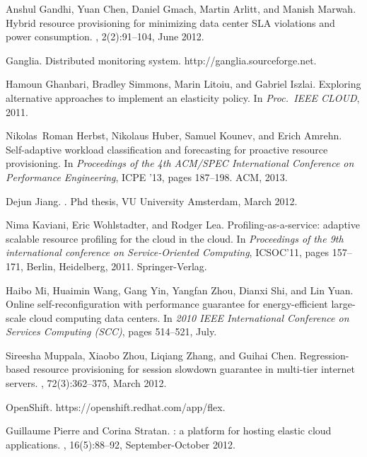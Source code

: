 \documentclass{sig-alternate-10pt}
\begin{document}
\begin{thebibliography}{10}
Anshul Gandhi, Yuan Chen, Daniel Gmach, Martin Arlitt, and Manish Marwah.
\newblock Hybrid resource provisioning for minimizing data center {SLA}
  violations and power consumption.
, 2(2):91--104,
  June 2012.

{Ganglia. Distributed monitoring system. http://ganglia.sourceforge.net}.

Hamoun Ghanbari, Bradley Simmons, Marin Litoiu, and Gabriel Iszlai.
\newblock Exploring alternative approaches to implement an elasticity policy.
\newblock In {\em Proc.\ IEEE CLOUD}, 2011.

Nikolas~Roman Herbst, Nikolaus Huber, Samuel Kounev, and Erich Amrehn.
\newblock Self-adaptive workload classification and forecasting for proactive
  resource provisioning.
\newblock In {\em Proceedings of the 4th ACM/SPEC International Conference on
  Performance Engineering}, ICPE '13, pages 187--198. ACM, 2013.

Dejun Jiang.
.
\newblock Phd thesis, VU University Amsterdam, March 2012.

Nima Kaviani, Eric Wohlstadter, and Rodger Lea.
\newblock Profiling-as-a-service: adaptive scalable resource profiling for the
  cloud in the cloud.
\newblock In {\em Proceedings of the 9th international conference on
  Service-Oriented Computing}, {ICSOC'11}, pages 157--171, Berlin, Heidelberg,
  2011. Springer-Verlag.

Haibo Mi, Huaimin Wang, Gang Yin, Yangfan Zhou, Dianxi Shi, and Lin Yuan.
\newblock Online self-reconfiguration with performance guarantee for
  energy-efficient large-scale cloud computing data centers.
\newblock In {\em 2010 {IEEE} International Conference on Services Computing
  ({SCC)}}, pages 514--521, July.

Sireesha Muppala, Xiaobo Zhou, Liqiang Zhang, and Guihai Chen.
\newblock Regression-based resource provisioning for session slowdown guarantee
  in multi-tier internet servers.
, 72(3):362--375,
  March 2012.

{OpenShift. https://openshift.redhat.com/app/flex}.


Guillaume Pierre and Corina Stratan.
: a platform for hosting elastic cloud applications.
, 16(5):88--92, September-October 2012.


\end{thebibliography}
\end{document}

